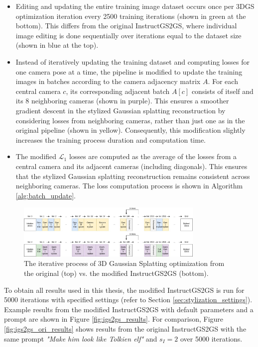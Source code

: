 \begin{itemize}
    \item Editing and updating the entire training image dataset occurs once per 3DGS optimization iteration every 2500 training iterations (shown in green at the bottom). This differs from the original InstructGS2GS, where individual image editing is done sequentially over iterations equal to the dataset size (shown in blue at the top).
    \item Instead of iteratively updating the training dataset and computing losses for one camera pose at a time, the pipeline is modified to update the training images in batches according to the camera adjacency matrix $A$. For each central camera $c$, its corresponding adjacent batch $A[c]$ consists of itself and its 8 neighboring cameras (shown in purple). This ensures a smoother gradient descent in the stylized Gaussian splatting reconstruction by considering losses from neighboring cameras, rather than just one as in the original pipeline (shown in yellow). Consequently, this modification slightly increases the training process duration and computation time.
    \item The modified $\mathcal{L}_1$ losses are computed as the average of the losses from a central camera and its adjacent cameras (including diagonals). This ensures that the stylized Gaussian splatting reconstruction remains consistent across neighboring cameras. The loss computation process is shown in Algorithm \ref{alg:batch_update}.
\end{itemize}



\begin{figure}
	\centering
	\includegraphics[width=0.8\textwidth]{Figures/methods/3dgs_loop.jpg}
	\caption{The iterative process of 3D Gaussian Splatting optimization from the original (top) vs. the modified InstructGS2GS (bottom).}
	\label{fig:3dgs_loop}
\end{figure}


To obtain all results used in this thesis, the modified InstructGS2GS is run for 5000 iterations with specified settings (refer to Section \ref{sec:stylization_settings}). Example results from the modified InstructGS2GS with default parameters and a prompt are shown in Figure \ref{fig:igs2gs_results}. For comparison, Figure \ref{fig:igs2gs_ori_results} shows results from the original InstructGS2GS with the same prompt \textit{"Make him look like Tolkien elf"} and $s_I = 2$ over 5000 iterations.

